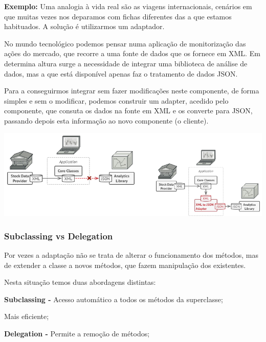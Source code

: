 \documentclass{article}
\begin{document}
\begin{flushleft}
    \textbf{Exemplo:} Uma analogia à vida real são as viagens internacionais, cenários em que muitas vezes nos deparamos com
    fichas diferentes das a que estamos habituados. A solução é utilizarmos um adaptador.

    No mundo tecnológico podemos pensar numa aplicação de monitorização das ações do mercado, que
    recorre a uma fonte de dados que os fornece em XML. Em determina altura surge a necessidade de
    integrar uma biblioteca de análise de dados, mas a que está disponível apenas faz o tratamento de dados
    JSON.

    Para a conseguirmos integrar sem fazer modificações neste componente, de forma simples e sem o
    modificar, podemos construir um adapter, acedido pelo componente, que consuta os dados na fonte em
    XML e os converte para JSON, passando depois esta informação ao novo componente (o cliente).

    \begin{center}
        \includegraphics[scale=0.5]{Images/40.png}
    \end{center}
\end{flushleft}

\subsubsection{Subclassing vs Delegation}

Por vezes a adaptação não se trata de alterar o funcionamento dos métodos, mas de 
extender a classe a novos métodos, que fazem manipulação dos existentes.

Nesta situação temos duas abordagens distintas:

\vspace{3mm}
\textbf{Subclassing -} Acesso automático a todos os métodos da superclasse;

Mais eficiente;

\vspace{2mm}
\textbf{Delegation -} Permite a remoção de métodos;
\end{document}
